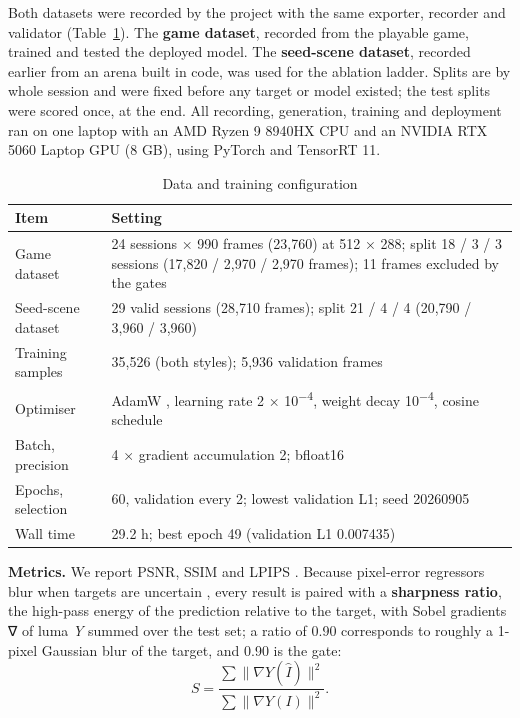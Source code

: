 \documentclass[conference]{IEEEtran}
\begin{document}
Both datasets were recorded by the project with the same exporter, recorder and validator (Table~\ref{tab:data}). The \textbf{game dataset}, recorded from the playable game, trained and tested the deployed model. The \textbf{seed-scene dataset}, recorded earlier from an arena built in code, was used for the ablation ladder. Splits are by whole session and were fixed before any target or model existed; the test splits were scored once, at the end. All recording, generation, training and deployment ran on one laptop with an AMD Ryzen 9 8940HX CPU and an NVIDIA RTX 5060 Laptop GPU (8 GB), using PyTorch \cite{pytorch} and TensorRT 11.
\begin{table}[!t]
\caption{Data and training configuration}\label{tab:data}
\centering
\footnotesize
\setlength{\tabcolsep}{4pt}
\begin{tabularx}{\columnwidth}{lX}
\toprule
Item & Setting \\
\midrule
Game dataset & 24 sessions × 990 frames (23,760) at 512 × 288; split 18 / 3 / 3 sessions (17,820 / 2,970 / 2,970 frames); 11 frames excluded by the gates \\
Seed-scene dataset & 29 valid sessions (28,710 frames); split 21 / 4 / 4 (20,790 / 3,960 / 3,960) \\
Training samples & 35,526 (both styles); 5,936 validation frames \\
Optimiser & AdamW \cite{adamw}, learning rate 2 × 10\textsuperscript{−4}, weight decay 10\textsuperscript{−4}, cosine schedule \cite{sgdr} \\
Batch, precision & 4 × gradient accumulation 2; bfloat16 \\
Epochs, selection & 60, validation every 2; lowest validation L1; seed 20260905 \\
Wall time & 29.2 h; best epoch 49 (validation L1 0.007435) \\
\bottomrule
\end{tabularx}
\end{table}

\textbf{Metrics.} We report PSNR, SSIM \cite{ssim} and LPIPS \cite{lpips}. Because pixel-error regressors blur when targets are uncertain \cite{pd}, every result is paired with a \textbf{sharpness ratio}, the high-pass energy of the prediction relative to the target, with Sobel gradients ∇ of luma \textit{Y} summed over the test set; a ratio of 0.90 corresponds to roughly a 1-pixel Gaussian blur of the target, and 0.90 is the gate:
\begin{equation}\label{eq:sharp}
S = \frac{\sum \lVert \nabla Y(\hat I) \rVert^2}{\sum \lVert \nabla Y(I) \rVert^2}.
\end{equation}
\end{document}
